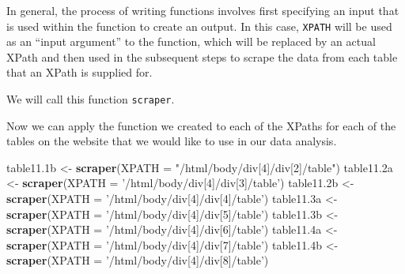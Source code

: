\documentclass[
]{article}
\newenvironment{Shaded}{\begin{snugshade}}{\end{snugshade}}
\newcommand{\ControlFlowTok}[1]{\textcolor[rgb]{0.13,0.29,0.53}{\textbf{#1}}}
\newcommand{\DataTypeTok}[1]{\textcolor[rgb]{0.13,0.29,0.53}{#1}}
\newcommand{\DecValTok}[1]{\textcolor[rgb]{0.00,0.00,0.81}{#1}}
\newcommand{\FloatTok}[1]{\textcolor[rgb]{0.00,0.00,0.81}{#1}}
\newcommand{\KeywordTok}[1]{\textcolor[rgb]{0.13,0.29,0.53}{\textbf{#1}}}
\newcommand{\NormalTok}[1]{#1}
\newcommand{\OperatorTok}[1]{\textcolor[rgb]{0.81,0.36,0.00}{\textbf{#1}}}
\newcommand{\StringTok}[1]{\textcolor[rgb]{0.31,0.60,0.02}{#1}}
\begin{document}
In general, the process of writing functions involves first specifying
an input that is used within the function to create an output. In this
case, \texttt{XPATH} will be used as an ``input argument'' to the
function, which will be replaced by an actual XPath and then used in the
subsequent steps to scrape the data from each table that an XPath is
supplied for.

We will call this function \texttt{scraper}.

\begin{Shaded}
\end{Shaded}

Now we can apply the function we created to each of the XPaths for each
of the tables on the website that we would like to use in our data
analysis.

\begin{Shaded}
\begin{Highlighting}[]
\NormalTok{table11}\FloatTok{.1}\NormalTok{b <-}\StringTok{ }\KeywordTok{scraper}\NormalTok{(}\DataTypeTok{XPATH =} \StringTok{"/html/body/div[4]/div[2]/table"}\NormalTok{)}
\NormalTok{table11}\FloatTok{.2}\NormalTok{a <-}\StringTok{ }\KeywordTok{scraper}\NormalTok{(}\DataTypeTok{XPATH =} \StringTok{'/html/body/div[4]/div[3]/table'}\NormalTok{)}
\NormalTok{table11}\FloatTok{.2}\NormalTok{b <-}\StringTok{ }\KeywordTok{scraper}\NormalTok{(}\DataTypeTok{XPATH =} \StringTok{'/html/body/div[4]/div[4]/table'}\NormalTok{)}
\NormalTok{table11}\FloatTok{.3}\NormalTok{a <-}\StringTok{ }\KeywordTok{scraper}\NormalTok{(}\DataTypeTok{XPATH =} \StringTok{'/html/body/div[4]/div[5]/table'}\NormalTok{)}
\NormalTok{table11}\FloatTok{.3}\NormalTok{b <-}\StringTok{ }\KeywordTok{scraper}\NormalTok{(}\DataTypeTok{XPATH =} \StringTok{'/html/body/div[4]/div[6]/table'}\NormalTok{)}
\NormalTok{table11}\FloatTok{.4}\NormalTok{a <-}\StringTok{ }\KeywordTok{scraper}\NormalTok{(}\DataTypeTok{XPATH =} \StringTok{'/html/body/div[4]/div[7]/table'}\NormalTok{)}
\NormalTok{table11}\FloatTok{.4}\NormalTok{b <-}\StringTok{ }\KeywordTok{scraper}\NormalTok{(}\DataTypeTok{XPATH =} \StringTok{'/html/body/div[4]/div[8]/table'}\NormalTok{)}
\end{Highlighting}
\end{Shaded}
\end{document}
